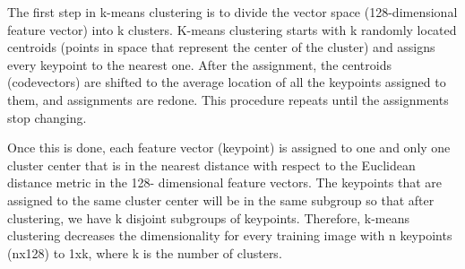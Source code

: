 \documentclass[12pt,fleqn]{book} %
\begin{document}
\bigskip
The first step in k-means clustering is to divide the vector space (128-dimensional feature 
vector) into k clusters. K-means clustering starts with k randomly located centroids (points in space that represent the center of the cluster) and assigns every keypoint to the nearest one. After 
the assignment, the centroids (codevectors) are shifted to the average location of all the 
keypoints assigned to them, and assignments are redone. This procedure repeats until the 
assignments stop changing.

\bigskip
Once this is done, each feature vector (keypoint) is assigned to one and only one cluster 
center that is in the nearest distance with respect to the Euclidean distance metric in the 128-
dimensional feature vectors. The keypoints that are assigned to the same cluster center will be in 
the same subgroup so that after clustering, we have k disjoint subgroups of keypoints. Therefore, 
k-means clustering decreases the dimensionality for every training image with n keypoints 
(nx128) to 1xk, where k is the number of clusters.
\end{document}
